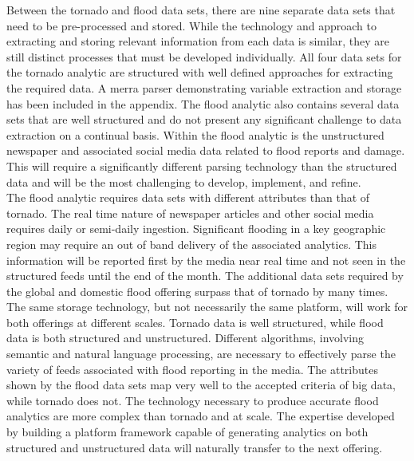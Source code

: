 Between the tornado and flood data sets, there are nine separate data sets that need to be pre-processed and stored. While the technology and approach to extracting and storing relevant information from each data is similar, they are still distinct processes that must be developed individually. All four data sets for the tornado analytic are structured with well defined approaches for extracting the required data.  A \gls{merra} parser demonstrating variable extraction and storage has been included in the appendix.  The flood analytic also contains several data sets that are well structured and do not present any significant challenge to data extraction on a continual basis. Within the flood analytic is the unstructured newspaper and associated social media data related to flood reports and damage. This will require a significantly different parsing technology than the structured data and will be the most challenging to develop, implement, and refine.\\

The flood analytic requires data sets with different attributes than that of tornado. The real time nature of newspaper articles and other social media requires daily or semi-daily ingestion. Significant flooding in a key geographic region may require an out of band delivery of the associated analytics.  This information will be reported first by the media near real time and not seen in the structured feeds until the end of the month. The additional data sets required by the global and domestic flood offering surpass that of tornado by many times. The same storage technology, but not necessarily the same platform, will work for both offerings at different scales. Tornado data is well structured, while flood data is both structured and unstructured. Different algorithms, involving semantic and natural language processing, are necessary to effectively parse the variety of feeds associated with flood reporting in the media.  The attributes shown by the flood  data sets map very well to the accepted criteria of big data, while tornado does not. The technology necessary to produce accurate flood analytics are more complex than tornado and at scale.  The expertise developed by building a platform framework capable of generating analytics on both structured and unstructured data will naturally transfer to the next \climatedge offering.